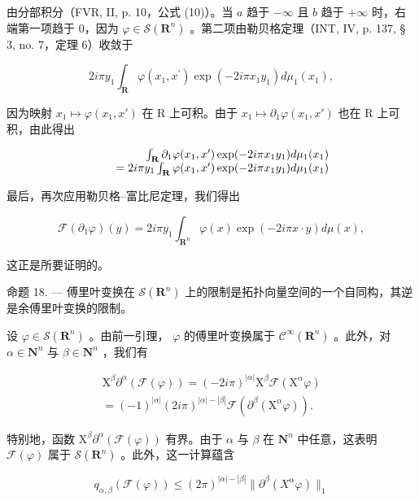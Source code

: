 由分部积分（FVR, II, p. 10，公式 (10)）。当 \(a\) 趋于 \(-\infty\) 且 \(b\) 趋于 \(+\infty\) 时，右端第一项趋于 0，因为 \(\varphi \in \mathcal{S}(\mathbf{R}^n)\) 。第二项由勒贝格定理（INT, IV, p. 137, § 3, no. 7，定理 6）收敛于

\[
2 i \pi y _ {1} \int_ {\mathbf {R}} \varphi (x _ {1}, x ^ {\prime}) \exp (- 2 i \pi x _ {1} y _ {1}) d \mu_ {1} (x _ {1}),
\]

因为映射 \(x_{1} \mapsto \varphi(x_{1}, x')\) 在 R 上可积。由于 \(x_{1} \mapsto \partial_{1}\varphi(x_{1}, x')\) 也在 R 上可积，由此得出

\[
\begin{array}{r l r} & & {\int_ {\mathbf {R}} \partial_ {1} \varphi (x _ {1}, x ^ {\prime}) \exp (- 2 i \pi x _ {1} y _ {1}) d \mu_ {1} (x _ {1})} \\ & & {= 2 i \pi y _ {1} \int_ {\mathbf {R}} \varphi (x _ {1}, x ^ {\prime}) \exp (- 2 i \pi x _ {1} y _ {1}) d \mu_ {1} (x _ {1})} \end{array}
\]

最后，再次应用勒贝格–富比尼定理，我们得出

\[
\mathcal {F} (\partial_ {1} \varphi) (y) = 2 i \pi y _ {1} \int_ {\mathbf {R} ^ {n}} \varphi (x) \exp (- 2 i \pi x \cdot y) d \mu (x),
\]

这正是所要证明的。

命题 18. --- 傅里叶变换在 \(\mathcal{S}(\mathbf{R}^{n})\) 上的限制是拓扑向量空间的一个自同构，其逆是余傅里叶变换的限制。

设 \(\varphi\in\mathcal{S}(\mathbf{R}^{n})\) 。由前一引理， \(\varphi\) 的傅里叶变换属于 \(\mathcal{C}^{\infty}(\mathbf{R}^{n})\) 。此外，对 \(\alpha\in\mathbf{N}^{n}\) 与 \(\beta\in\mathbf{N}^{n}\) ，我们有

\[
\begin{array}{r} \mathrm{X} ^ {\beta} \partial^ {\alpha} (\mathcal {F} (\varphi)) = (- 2 i \pi) ^ {| \alpha |} \mathrm{X} ^ {\beta} \mathcal {F} (\mathrm{X} ^ {\alpha} \varphi) \\ = (- 1) ^ {| \alpha |} (2 i \pi) ^ {| \alpha | - | \beta |} \mathcal {F} (\partial^ {\beta} (\mathrm{X} ^ {\alpha} \varphi)). \end{array}
\]

特别地，函数 \(\mathrm{X}^{\beta}\partial^{\alpha}(\mathcal{F}(\varphi))\) 有界。由于 \(\alpha\) 与 \(\beta\) 在 \(\mathbf{N}^{n}\) 中任意，这表明 \(\mathcal{F}(\varphi)\) 属于 \(\mathcal{S}(\mathbf{R}^{n})\) 。此外，这一计算蕴含

\[
q _ {\alpha , \beta} (\mathcal {F} (\varphi)) \leqslant (2 \pi) ^ {| \alpha | - | \beta |} \| \partial^ {\beta} (X ^ {\alpha} \varphi) \| _ {1}
\]

